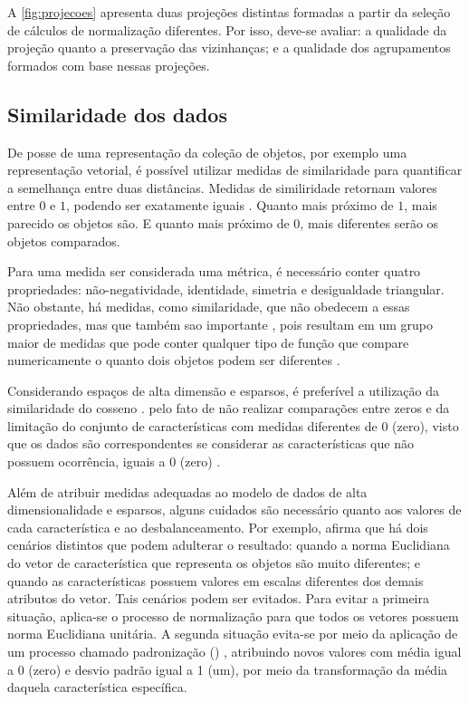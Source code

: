 			A \cref{fig:projecoes} apresenta duas projeções distintas formadas a partir da
			seleção de cálculos de normalização diferentes. Por isso, deve-se avaliar: a
			qualidade da projeção quanto a preservação das vizinhanças; e a qualidade dos
			agrupamentos formados com base nessas projeções.

			
		\subsection{Similaridade dos dados}
		\label{subsec:similaridade}
			De posse de uma representação da coleção de objetos, por exemplo uma representação
			vetorial, é possível utilizar medidas de similaridade para quantificar a semelhança
			entre duas distâncias. Medidas de similiridade retornam valores entre $0$ e $1$,
			podendo ser exatamente iguais \cite{Alencar}. Quanto mais próximo de $1$, mais
			parecido os objetos são. E quanto mais próximo de $0$, mais diferentes serão os objetos
			comparados.
			
			Para uma medida ser considerada uma métrica, é necessário conter quatro propriedades:
			não-negatividade, identidade, simetria e desigualdade triangular. Não obstante, há
			medidas, como similaridade, que não obedecem a essas propriedades, mas que também
			sao importante \cite{phd:paulovich}, pois resultam em um grupo maior de medidas que
			pode conter qualquer tipo de função que compare numericamente o quanto dois objetos
			podem ser diferentes \cite{Tan:2005:IDM:1095618}.
			
			Considerando espaços de alta dimensão e esparsos, é preferível a utilização da
			similaridade do cosseno \cite{phd:paulovich}. pelo fato de não realizar
			comparações entre zeros e da limitação do conjunto de características com
			medidas diferentes de 0 (zero), visto que os dados são correspondentes se
			considerar as características que não possuem ocorrência, iguais a $0$
			(zero) \cite{Tan:2005:IDM:1095618,phd:paulovich}.
			
			Além de atribuir medidas adequadas ao modelo de dados de alta dimensionalidade
			e esparsos, alguns cuidados são necessário quanto aos valores de cada
			característica e ao desbalanceamento. Por exemplo, 
			afirma que há dois cenários distintos que podem adulterar o resultado: quando
			a norma Euclidiana do vetor de característica que representa os objetos são
			muito diferentes; e quando as características possuem valores em escalas
			diferentes dos demais atributos do vetor. Tais cenários podem ser evitados.
			Para evitar a primeira situação, aplica-se o processo de normalização para
			que todos os vetores possuem norma Euclidiana unitária. A segunda situação
			evita-se por meio da aplicação de um processo chamado padronização
			() \cite{Tan:2005:IDM:1095618}, atribuindo novos
			valores com média igual a 0 (zero) e desvio padrão igual a 1 (um), por meio
			da transformação da média daquela característica específica.
			
